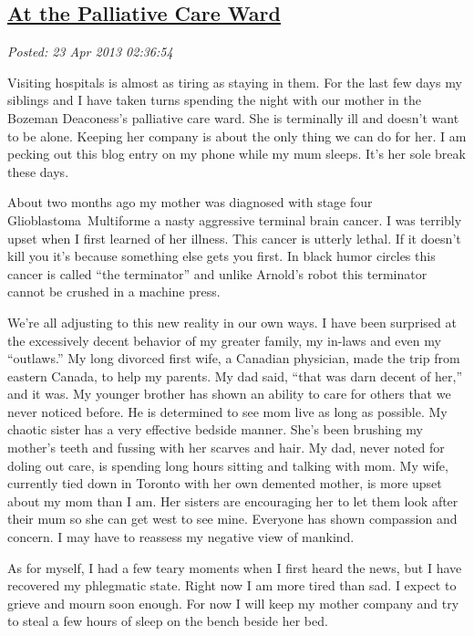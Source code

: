 %

\subsection*{\href{https://bakerjd99.wordpress.com/2013/04/22/at-the-palliative-care-ward/}{At the Palliative Care Ward}}


\noindent\emph{Posted: 23 Apr 2013 02:36:54}
\vspace{6pt}

Visiting hospitals is almost as tiring as staying in them. For the last
few days my siblings and I have taken turns spending the night with our
mother in the Bozeman Deaconess's palliative care ward. She is
terminally ill and doesn't want to be alone. Keeping her company is
about the only thing we can do for her. I am pecking out this blog entry
on my phone while my mum sleeps. It's her sole break these days.

About two months ago my mother was diagnosed with stage four
Glioblastoma~Multiforme a nasty aggressive terminal brain cancer. I was
terribly upset when I first learned of her illness. This cancer is
utterly lethal. If it doesn't kill you it's because something else gets
you first. In black humor circles this cancer is called ``the
terminator'' and unlike Arnold's robot this terminator cannot be crushed
in a machine press.

We're all adjusting to this new reality in our own ways. I have been
surprised at the excessively decent behavior of my greater family, my
in-laws and even my ``outlaws.'' My long divorced first wife, a Canadian
physician, made the trip from eastern Canada, to help my parents. My dad
said, ``that was darn decent of her,'' and it was. My younger brother
has shown an ability to care for others that we never noticed before. He
is determined to see mom live as long as possible. My chaotic sister has
a very effective bedside manner. She's been brushing my mother's teeth
and fussing with her scarves and hair. My dad, never noted for doling
out care, is spending long hours sitting and talking with mom. My wife,
currently tied down in Toronto with her own demented mother, is more
upset about my mom than I am. Her sisters are encouraging her to let
them look after their mum so she can get west to see mine. Everyone has
shown compassion and concern. I may have to reassess my negative view of
mankind.

As for myself, I had a few teary moments when I first heard the news,
but I have recovered my phlegmatic state. Right now I am more tired than
sad. I expect to grieve and mourn soon enough. For now I will keep my
mother company and try to steal a few hours of sleep on the bench beside
her bed.



%